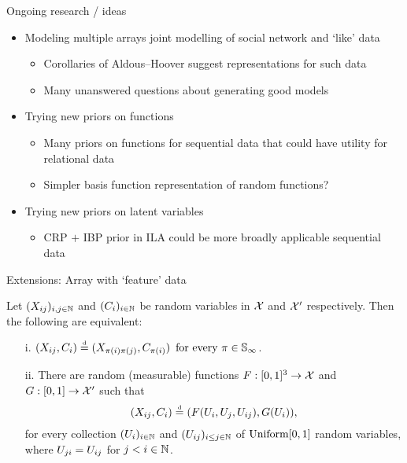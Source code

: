 \begin{frame}{Ongoing research / ideas}
  \begin{block}{}
    \begin{itemize}
      \item Modeling multiple arrays \eg joint modelling of social network and `like' data
      \begin{itemize}
        \item Corollaries of Aldous--Hoover suggest representations for such data
        \item Many unanswered questions about generating good models
      \end{itemize}
      \vspace{\baselineskip}
      \item Trying new priors on functions
      \begin{itemize}
        \item Many priors on functions for sequential data that could have utility for relational data
        \item \eg Simpler basis function representation of random functions?
      \end{itemize}
      \vspace{\baselineskip}
      \item Trying new priors on latent variables
      \begin{itemize}
        \item CRP $+$ IBP prior in ILA could be more broadly applicable \eg sequential data
      \end{itemize}
    \end{itemize}
  \end{block}
\end{frame}

\begin{frame}{Extensions: Array with `feature' data}
  \begin{block}{}
\begin{cor}
  \label{theorem:ahcov}
  Let $(X_{ij})_{i,j\in\mathbb{N}}$ and $(C_i)_{i\in\mathbb{N}}$ be random variables in $\mathcal{X}$ and $\mathcal{X}'$ respectively.  Then the following are equivalent:
\begin{enumerate}  
\item[i.] $(X_{ij}, C_i)\stackrel{\mbox{\tiny d}}{=}(X_{\pi(i)\pi(j)}, C_{\pi(i)}) \,\text{ for every }\pi\in\mathbb{S}_{\infty}$. 
\item[ii.] There are random (measurable) functions $F:[0,1]^3\rightarrow\mathcal{X}$ and $G:[0,1]\rightarrow\mathcal{X}'$ such that 
   \begin{equation}
    \label{eq:ah:cov}
    (X_{ij}, C_i)\stackrel{\mbox{\tiny d}}{=} (F(U_i,U_j,U_{ij}), G(U_i)), \nonumber
  \end{equation}
for every collection $(U_i)_{i\in\mathbb{N}}$ and $(U_{ij})_{i\le j\in\mathbb{N}}$ of \iid $\mbox{\rm Uniform}[0,1]$ random variables, where $U_{ji} = U_{ij}$ for $j < i \in \mathbb{N}$.
\end{enumerate}
\end{cor}
  \end{block}
\end{frame}

